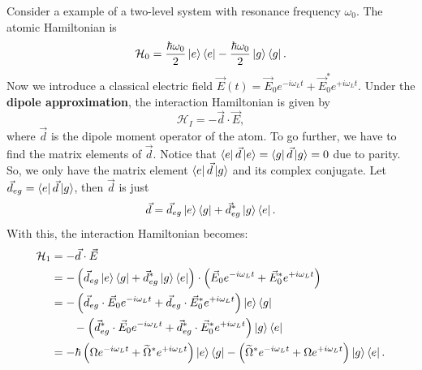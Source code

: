 \documentclass{book}
\theoremstyle{definition}
\newcommand{\ham}{\mathcal{H}}
\newcommand{\f}[2]{\frac{#1}{#2}}
\newcommand{\lp}{\left(}
\newcommand{\rp}{\right)}
\begin{document}
Consider a example of a two-level system with resonance frequency $\omega_0$. The atomic Hamiltonian is 
\begin{equation*}
\ham_0 = \f{\hbar \omega_0}{2}\ket{e}\bra{e} - \f{\hbar\omega_0}{2}\ket{g}\bra{g}.
\end{equation*}
Now we introduce a classical electric field $\vec{E}(t) = \vec{E}_0 e^{-i\omega_L t} + \vec{E}_0^* e^{+i \omega_L t}$. Under the \textbf{dipole approximation}, the interaction Hamiltonian is given by 
\begin{equation*}
\ham_I = -\vec{d} \cdot \vec{E},
\end{equation*}
where $\vec{d}$ is the dipole moment operator of the atom. To go further, we have to find the matrix elements of $\vec{d}$. Notice that $\bra{e} \vec{d} \ket{e} = \bra{g}\vec{d}\ket{g} = 0$ due to parity. So, we only have the matrix element $\bra{e} \vec{d} \ket{g}$ and its complex conjugate. Let $\vec{d}_{eg} = \bra{e} \vec{d} \ket{g}$, then $\vec{d}$ is just 
\begin{equation*}
\vec{d} = \vec{d}_{eg} \ket{e}\bra{g} + \vec{d}_{eg}^* \ket{g}\bra{e}. 
\end{equation*}
With this, the interaction Hamiltonian becomes:
\begin{align*}
\ham_1 
&=  -\vec{d}\cdot \vec{E}\\
&= - \lp \vec{d}_{eg} \ket{e}\bra{g} + \vec{d}_{eg}^* \ket{g}\bra{e} \rp
 \cdot \lp \vec{E}_0 e^{-i\omega_L t} + \vec{E}_0^* e^{+i \omega_L t} \rp\\
&= - \lp \vec{d}_{eg}\cdot \vec{E}_0 e^{-i\omega_L t} + \vec{d}_{eg}\cdot \vec{E}_0^* e^{+i\omega_L t} \rp \ket{e}\bra{g}\\
&\quad\quad - \lp \vec{d}_{eg}^*\cdot \vec{E}_0 e^{-i\omega_L t} + \vec{d}_{eg}^*\cdot \vec{E}_0^* e^{+i\omega_L t} \rp \ket{g}\bra{e}\\
&= -\hbar \lp \Omega e^{-i\omega_L t} + \widetilde{\Omega}^*e^{+i\omega_L t} \rp \ket{e}\bra{g} - \lp \widetilde{\Omega}^* e^{-i\omega_L t} + \Omega e^{+i\omega_L t} \rp \ket{g}\bra{e}.
\end{align*}
\end{document}
